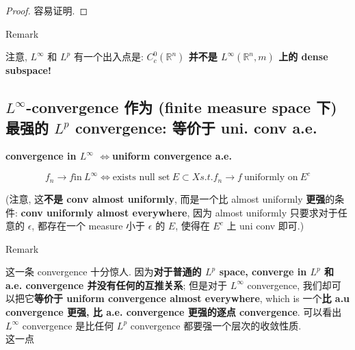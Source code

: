 \documentclass{qlnotes-export}
\begin{document}
\begin{proof}

容易证明.

\end{proof}

\begin{qlremark}{Remark}

注意, \(L^{\infty}\) 和 \(L^{p}\) 有一个出入点是: \textbf{\(C_{c}^{0}({\mathbb{R}}^{n})\) 并不是 \(L^{\infty}({\mathbb{R}}^{n},m)\) 上的 dense subspace!}\\

\end{qlremark}

\subsection{\texorpdfstring{\(L^{\infty}\)-convergence 作为 (finite measure space 下) 最强的 \(L^{p}\) convergence: 等价于 uni. conv a.e.}{L\^{}\{\textbackslash infty\}-convergence 作为 (finite measure space 下) 最强的 L\^{}\{p\} convergence: 等价于 uni. conv a.e.}}\label{linfty-convergence-ux4f5cux4e3a-finite-measure-space-ux4e0b-ux6700ux5f3aux7684-lp-convergence-ux7b49ux4ef7ux4e8e-uni.-conv-a.e.}

\begin{theorem}{\protect{}\label{kn-convergence-in-l-infty-iffuniform-convergence-a-e}{\textbf{convergence
in \(L^{\infty}\) \(\Leftrightarrow\)uniform convergence a.e.}}}

\[f_{n}\rightarrow f\text{in}\ L^{\infty}\Leftrightarrow\text{exists null set}\ E \subset X s.t.f_{n}\rightarrow f\ \text{uniformly on}\ E^{c}\]

(注意, 这\textbf{不是 conv almost uniformly}, 而是一个比 almost uniformly \textbf{更强}的条件: \textbf{conv uniformly almost everywhere}, 因为 almost uniformly 只要求对于任意的 \(\epsilon\), 都存在一个 measure 小于 \(\epsilon\) 的 \(E\), 使得在 \(E^{c}\) 上 uni conv 即可.)

\end{theorem}

\begin{qlremark}{Remark}

这一条 convergence 十分惊人. 因为\textbf{对于普通的 \(L^{p}\) space, converge in \(L^{p}\) 和 a.e. convergence 并没有任何的互推关系}; 但是对于 \(L^{\infty}\) convergence, 我们却可以把它\textbf{等价于 uniform convergence almost everywhere}, which is 一个\textbf{比 a.u convergence 更强, 比 a.e. convergence 更强的逐点 convergence}. 可以看出 \(L^{\infty}\) convergence 是比任何 \(L^{p}\) convergence 都要强一个层次的收敛性质.\\
这一点

\end{qlremark}
\end{document}
